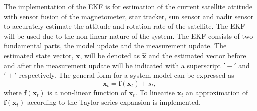 %	
%	
%	
%	
%	
%	

The implementation of the EKF is for estimation of the current satellite attitude with sensor fusion of the magnetometer, star tracker, sun sensor and nadir sensor to accurately estimate the attitude and rotation rate of the satellite. The EKF will be used due to the non-linear nature of the system. The EKF consists of two fundamental parts, the model update and the measurement update. The estimated state vector, $\mathbf{x}$, will be denoted as $\hat{\mathbf{x}}$ and the estimated vector before and after the measurement update will be indicated with a superscript $'-'$ and $'+'$ respectively. The general form for a system model can be expressed as
\begin{equation}
\mathbf{\dot{x}}_t = \mathbf{f}(\mathbf{x}_t) + s_t,
\end{equation}
where $\mathbf{f}(\mathbf{x}_t)$ is a non-linear function of $\mathbf{x}_t$. To linearise $\mathbf{x}_t$ an approximation of $\mathbf{f}(\mathbf{x}_t)$ according to the Taylor series expansion is implemented.

